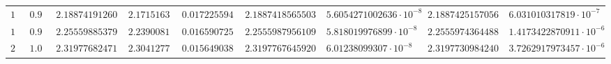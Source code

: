 \begin{table}[h!]
\begin{tabular}{|l|l|l|l|l|l|l|l|l|}
		$ 18 $ & $                 0.90 $ & $     2.188741912604 $ & $ 2.17151631 $ & $   0.017225594 $ & $ 2.18874185655034 $ & $ 5.6054271002636 \cdot 10^{-8} $ & $ 2.18874251570564 $     & $  6.031010317819\cdot 10^{-7} $ \\
		$ 19 $ & $                0.95 $  & $      2.25559885379 $ & $ 2.23900812 $ & $  0.0165907258 $ & $ 2.25559879561097 $ & $  5.818019976899 \cdot 10^{-8} $ & $  2.2555974364488 $     & $ 1.4173422870911\cdot 10^{-6} $ \\
		$ 20 $ & $                 1.00 $ & $      2.31977682471 $ & $ 2.30412778 $ & $  0.0156490384 $ & $  2.3197767645920 $ & $   6.01238099307 \cdot 10^{-8} $ & $ 2.31977309842405 $     & $ 3.7262917973457\cdot 10^{-6} $ \\
		\hline
	\end{tabular}
\end{table}


